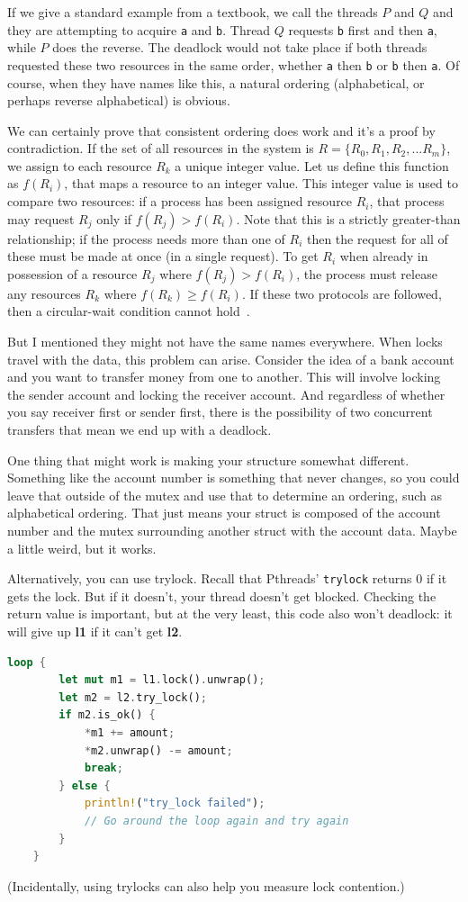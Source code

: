 If we give a standard example from a textbook, we call the threads $P$ and $Q$ and they are attempting to acquire \texttt{a} and \texttt{b}. Thread $Q$ requests \texttt{b} first and then \texttt{a}, while $P$ does the reverse. The deadlock would not take place if both threads requested these two resources in the same order, whether \texttt{a} then \texttt{b} or \texttt{b} then \texttt{a}. Of course, when they have names like this, a natural ordering (alphabetical, or perhaps reverse alphabetical) is obvious.

We can certainly prove that consistent ordering does work and it's a proof by contradiction. If the set of all resources in the system is $R = \{R_{0}, R_{1}, R_{2}, ... R_{m}\}$, we assign to each resource $R_{k}$ a unique integer value. Let us define this function as $f(R_{i})$, that maps a resource to an integer value. This integer value is used to compare two resources: if a process has been assigned resource $R_{i}$, that process may request $R_{j}$ only if $f(R_{j}) > f(R_{i})$. Note that this is a strictly greater-than relationship; if the process needs more than one of $R_{i}$ then the request for all of these must be made at once (in a single request). To get $R_{i}$ when already in possession of a resource $R_{j}$ where $f(R_{j}) > f(R_{i})$, the process must release any resources $R_{k}$ where $f(R_{k}) \geq f(R_{i})$. If these two protocols are followed, then a circular-wait condition cannot hold~\cite{osc}.

But I mentioned they might not have the same names everywhere. When locks travel with the data, this problem can arise. Consider the idea of a bank account and you want to transfer money from one to another. This will involve locking the sender account and locking the receiver account. And regardless of whether you say receiver first or sender first, there is the possibility of two concurrent transfers that mean we end up with a deadlock.

One thing that might work is making your structure somewhat different. Something like the account number is something that never changes, so you could leave that outside of the mutex and use that to determine an ordering, such as alphabetical ordering. That just means your struct is composed of the account number and the mutex surrounding another struct with the account data. Maybe a little weird, but it works.

Alternatively, you can use trylock. Recall that Pthreads' {\tt trylock}
returns 0 if it gets the lock. But if it doesn't, your thread doesn't get blocked. Checking the return value is important, but at the very least, this code also won't deadlock: it will give up {\bf l1} if it can't get {\bf l2}.
  \begin{lstlisting}[language=Rust]
    loop {
        let mut m1 = l1.lock().unwrap();
        let m2 = l2.try_lock();
        if m2.is_ok() {
            *m1 += amount;
            *m2.unwrap() -= amount;
            break;
        } else {
            println!("try_lock failed");
            // Go around the loop again and try again
        }
    }
  \end{lstlisting}
  (Incidentally, using trylocks can also help you measure lock contention.)

